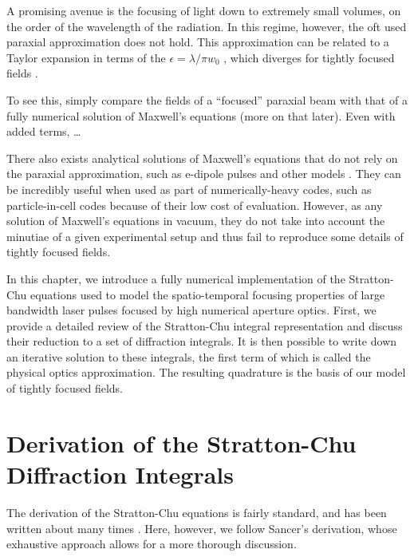 \documentclass[11pt,SymmetricalJury]{inrsthesis/inrsthesis}
\begin{document}

A promising avenue is the focusing of light down to extremely small volumes, on the order
of the wavelength of the radiation. In this regime, however, the oft used paraxial approximation
does not hold. This approximation can be related to a Taylor expansion in terms
of the $\epsilon=\lambda/\pi w_0$ \cite{Lax1975}, which diverges for tightly focused
fields \cite{Borghi2003}.

To see this, simply compare the fields of a ``focused'' paraxial beam with that
of a fully numerical solution of Maxwell's equations (more on that later).
Even with added terms, \ldots{}

There also exists analytical solutions of Maxwell's equations that do not rely
on the paraxial approximation, such as e-dipole pulses and other models
\cite{Gonoskov2012,Salamin2015a,Salamin2015b}. They can be incredibly useful when used as part of
numerically-heavy codes, such as particle-in-cell codes because of their low
cost of evaluation. However, as any solution of Maxwell's equations in vacuum,
they do not take into account the minutiae of a given experimental setup
and thus fail to reproduce some details of tightly focused fields.

In this chapter, we introduce a fully numerical implementation of the Stratton-Chu
equations used to model the spatio-temporal focusing properties of large
bandwidth laser pulses focused by high numerical aperture optics. First, we
provide a detailed review of the Stratton-Chu integral representation and discuss
their reduction to a set of diffraction integrals. 
It is then possible to write down an iterative solution to these integrals, the
first term of which is called the physical optics approximation. The resulting
quadrature is the basis of our model of tightly focused fields.

\section{Derivation of the Stratton-Chu Diffraction Integrals}

The derivation of the Stratton-Chu equations is fairly standard, and has been
written about many times \cite{}. Here, however, we follow Sancer's derivation,
whose exhaustive approach allows for a more thorough discussion.
\end{document}
